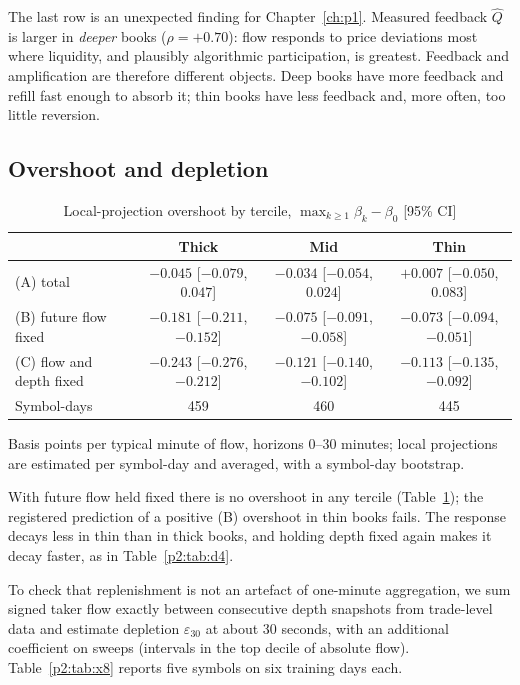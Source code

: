 The last row is an unexpected finding for Chapter~\ref{ch:p1}. Measured feedback $\hat Q$ is larger in \emph{deeper} books ($\rho=+0.70$): flow responds to price deviations most where liquidity, and plausibly algorithmic participation, is greatest. Feedback and amplification are therefore different objects. Deep books have more feedback and refill fast enough to absorb it; thin books have less feedback and, more often, too little reversion.

\subsection{Overshoot and depletion}

\begin{table}[t]\centering\small
\begin{threeparttable}
\caption{Local-projection overshoot by tercile, $\max_{k\ge1}\beta_k-\beta_0$ [95\% CI]}\label{p2:tab:x4}
\setlength{\tabcolsep}{3pt}
\begin{tabular}{lccc}
\toprule
 & Thick & Mid & Thin\\
\midrule
(A) total & $-0.045$ [$-0.079$, $0.047$] & $-0.034$ [$-0.054$, $0.024$] & $+0.007$ [$-0.050$, $0.083$]\\
(B) future flow fixed & $-0.181$ [$-0.211$, $-0.152$] & $-0.075$ [$-0.091$, $-0.058$] & $-0.073$ [$-0.094$, $-0.051$]\\
(C) flow and depth fixed & $-0.243$ [$-0.276$, $-0.212$] & $-0.121$ [$-0.140$, $-0.102$] & $-0.113$ [$-0.135$, $-0.092$]\\
Symbol-days & 459 & 460 & 445\\
\bottomrule
\end{tabular}
\begin{tablenotes}\footnotesize\item Basis points per typical minute of flow, horizons 0--30 minutes; local projections are estimated per symbol-day and averaged, with a symbol-day bootstrap. \end{tablenotes}
\end{threeparttable}
\end{table}

With future flow held fixed there is no overshoot in any tercile (Table~\ref{p2:tab:x4}); the registered prediction of a positive (B) overshoot in thin books fails. The response decays less in thin than in thick books, and holding depth fixed again makes it decay faster, as in Table~\ref{p2:tab:d4}.

To check that replenishment is not an artefact of one-minute aggregation, we sum signed taker flow exactly between consecutive depth snapshots from trade-level data and estimate depletion $\varepsilon_{30}$ at about 30 seconds, with an additional coefficient on sweeps (intervals in the top decile of absolute flow). Table~\ref{p2:tab:x8} reports five symbols on six training days each.

